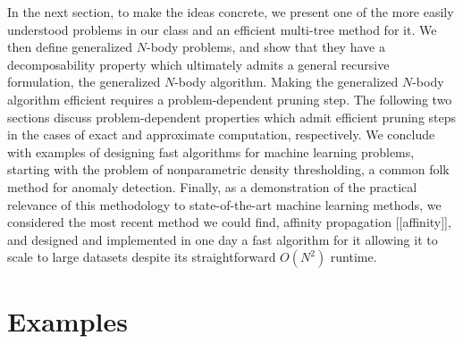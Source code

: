 \documentclass{article}
\begin{document}
In the next section, to make the ideas concrete, we present one of the
more easily understood problems in our class and an efficient
multi-tree method for it.  We then define generalized $N$-body
problems, and show that they have a decomposability property which
ultimately admits a general recursive formulation, the generalized
$N$-body algorithm.  Making the generalized $N$-body algorithm
efficient requires a problem-dependent pruning step.  The following
two sections discuss problem-dependent properties which admit
efficient pruning steps in the cases of exact and approximate
computation, respectively.  We conclude with examples of designing
fast algorithms for machine learning problems, starting with the
problem of nonparametric density thresholding, a common folk method
for anomaly detection.  Finally, as a demonstration of the practical
relevance of this methodology to state-of-the-art machine learning
methods, we considered the most recent method we could find, affinity
propagation [[affinity]], and designed and implemented in one day a
fast algorithm for it allowing it to scale to large datasets despite
its straightforward $O(N^2)$ runtime.

\section{Examples}

\end{document}
